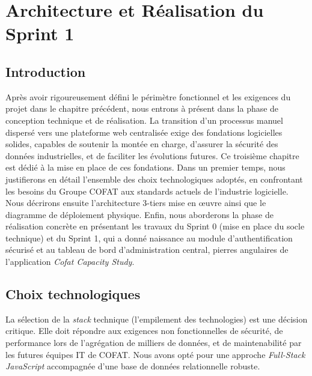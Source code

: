\chapter{Architecture et Réalisation du Sprint 1}
\label{chap:architecture_sprint1}

\section{Introduction}
Après avoir rigoureusement défini le périmètre fonctionnel et les exigences du projet dans le chapitre précédent, nous entrons à présent dans la phase de conception technique et de réalisation. La transition d'un processus manuel dispersé vers une plateforme web centralisée exige des fondations logicielles solides, capables de soutenir la montée en charge, d'assurer la sécurité des données industrielles, et de faciliter les évolutions futures. Ce troisième chapitre est dédié à la mise en place de ces fondations. Dans un premier temps, nous justifierons en détail l'ensemble des choix technologiques adoptés, en confrontant les besoins du Groupe COFAT aux standards actuels de l'industrie logicielle. Nous décrirons ensuite l'architecture 3-tiers mise en œuvre ainsi que le diagramme de déploiement physique. Enfin, nous aborderons la phase de réalisation concrète en présentant les travaux du Sprint 0 (mise en place du socle technique) et du Sprint 1, qui a donné naissance au module d'authentification sécurisé et au tableau de bord d'administration central, pierres angulaires de l'application \textit{Cofat Capacity Study}.

\section{Choix technologiques}
La sélection de la \textit{stack} technique (l'empilement des technologies) est une décision critique. Elle doit répondre aux exigences non fonctionnelles de sécurité, de performance lors de l'agrégation de milliers de données, et de maintenabilité par les futures équipes IT de COFAT. Nous avons opté pour une approche \textit{Full-Stack JavaScript} accompagnée d'une base de données relationnelle robuste.

